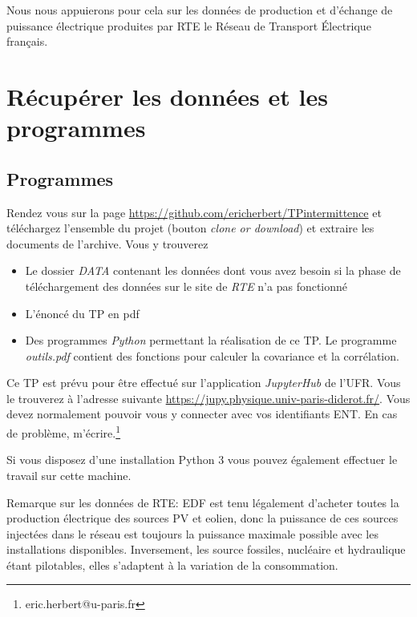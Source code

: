\documentclass[12pt,a4]{article}
\newcommand{\tmtextit}[1]{{\itshape{#1}}}
\begin{document}
Nous nous appuierons pour cela sur les données de production et d'échange de puissance électrique produites par RTE le Réseau de Transport Électrique français.


\section{Récupérer les données et les programmes}

\subsection{Programmes}

Rendez vous sur la page \newline
\href{https://github.com/ericherbert/TPintermittence}{https://github.com/ericherbert/TPintermittence} et téléchargez l'ensemble du projet (bouton \tmtextit{clone or download}) et extraire les
documents de l'archive. Vous y trouverez
\begin{itemize}
  \item Le dossier \tmtextit{DATA} contenant les données dont vous avez
  besoin si la phase de téléchargement des données sur le site de
  \tmtextit{RTE} n'a pas fonctionné
  
  \item L'énoncé du TP en pdf
  
  \item Des programmes \tmtextit{Python} permettant la réalisation de ce TP. Le programme \textit{outils.pdf} contient des fonctions pour calculer la covariance et la corrélation.
\end{itemize}
Ce TP est prévu pour être effectué sur l'application \tmtextit{JupyterHub}
de l'UFR. Vous le trouverez à l'adresse suivante
\href{https://jupy.physique.univ-paris-diderot.fr/}{https://jupy.physique.univ-paris-diderot.fr/}. Vous devez normalement pouvoir vous y connecter avec vos identifiants ENT. En
cas de problème, m'écrire.\footnote{eric.herbert@u-paris.fr}

Si vous disposez d'une installation Python 3 vous pouvez également effectuer le travail sur cette machine.

Remarque sur les données de RTE: EDF est tenu légalement d'acheter toutes la
production électrique des sources PV et eolien, donc la puissance de ces sources injectées dans le réseau est toujours la puissance maximale possible avec les installations disponibles. Inversement, les source fossiles, nucléaire et hydraulique étant pilotables, elles s'adaptent à la variation de la consommation.
\end{document}
